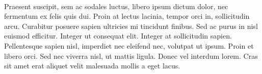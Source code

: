 \paragraph{} Praesent suscipit, sem ac sodales luctus, libero ipsum dictum dolor, nec fermentum ex felis quis dui. Proin at lectus lacinia, tempor orci in, sollicitudin arcu. Curabitur posuere sapien ultricies mi tincidunt finibus. Sed ac purus in nisl euismod efficitur. Integer ut consequat elit. Integer at sollicitudin sapien. Pellentesque sapien nisl, imperdiet nec eleifend nec, volutpat ut ipsum. Proin et libero orci. Sed nec viverra nisl, ut mattis ligula. Donec vel interdum lorem. Cras sit amet erat aliquet velit malesuada mollis a eget lacus.
